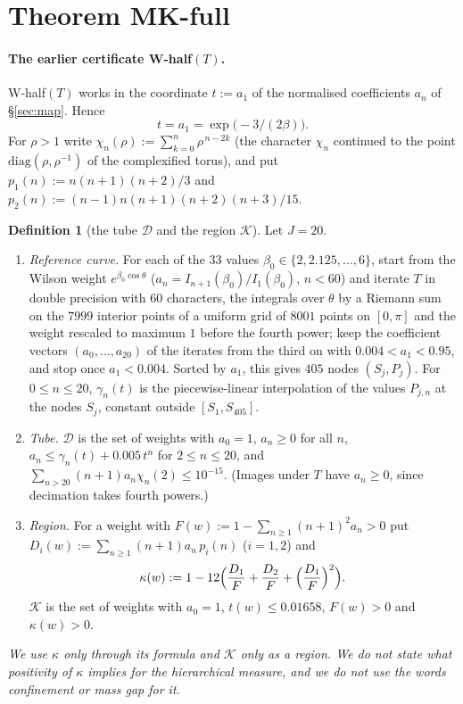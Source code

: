 \documentclass[11pt,a4paper]{article}
\theoremstyle{definition}
\newtheorem{definition}[theorem]{Definition}
\theoremstyle{remark}
\newcommand{\cD}{\mathcal{D}}
\newcommand{\cK}{\mathcal{K}}
\begin{document}
\section{Theorem MK-full}\label{sec:mkfull}

\paragraph{The earlier certificate W-half$(T)$.}
W-half$(T)$ works in the coordinate $t:=a_1$ of the normalised coefficients $a_n$ of \S\ref{sec:map}.
Hence
\[
t=a_1=\exp\bigl(-3/(2\beta)\bigr).
\]
For $\rho>1$ write $\chi_n(\rho):=\sum_{k=0}^{n}\rho^{\,n-2k}$ (the character $\chi_n$ continued to the point $\mathrm{diag}(\rho,\rho^{-1})$ of the complexified torus), and put $p_1(n):=n(n+1)(n+2)/3$ and $p_2(n):=(n-1)n(n+1)(n+2)(n+3)/15$.

\begin{definition}[the tube $\cD$ and the region $\cK$]\label{def:D}
Let $J=20$.
\begin{enumerate}[label=(\alph*),nosep]
\item \emph{Reference curve.} For each of the $33$ values $\beta_0\in\{2,2.125,\dots,6\}$, start from the Wilson weight $e^{\beta_0\cos\theta}$ ($a_n=I_{n+1}(\beta_0)/I_1(\beta_0)$, $n<60$) and iterate $T$ in double precision with $60$ characters, the integrals over $\theta$ by a Riemann sum on the $7999$ interior points of a uniform grid of $8001$ points on $[0,\pi]$ and the weight rescaled to maximum $1$ before the fourth power; keep the coefficient vectors $(a_0,\dots,a_{20})$ of the iterates from the third on with $0.004<a_1<0.95$, and stop once $a_1<0.004$.
Sorted by $a_1$, this gives $405$ nodes $(S_j,P_j)$.
For $0\le n\le20$, $\gamma_n(t)$ is the piecewise-linear interpolation of the values $P_{j,n}$ at the nodes $S_j$, constant outside $[S_1,S_{405}]$.
\item \emph{Tube.} $\cD$ is the set of weights with $a_0=1$, $a_n\ge0$ for all $n$, $a_n\le\gamma_n(t)+0.005\,t^n$ for $2\le n\le 20$, and $\sum_{n>20}(n+1)a_n\chi_n(2)\le10^{-15}$. (Images under $T$ have $a_n\ge0$, since decimation takes fourth powers.)
\item \emph{Region.} For a weight with $F(w):=1-\sum_{n\ge1}(n+1)^2a_n>0$ put $D_i(w):=\sum_{n\ge1}(n+1)a_n\,p_i(n)$ ($i=1,2$) and
\[
\kappa(w):=1-12\Bigl(\frac{D_1}{F}+\frac{D_2}{F}+\Bigl(\frac{D_1}{F}\Bigr)^2\Bigr).
\]
$\cK$ is the set of weights with $a_0=1$, $t(w)\le0.01658$, $F(w)>0$ and $\kappa(w)>0$.
\end{enumerate}
\end{definition}
\emph{We use $\kappa$ only through its formula and $\cK$ only as a region. We do not state what positivity of $\kappa$ implies for the hierarchical measure, and we do not use the words confinement or mass gap for it.}
\end{document}
